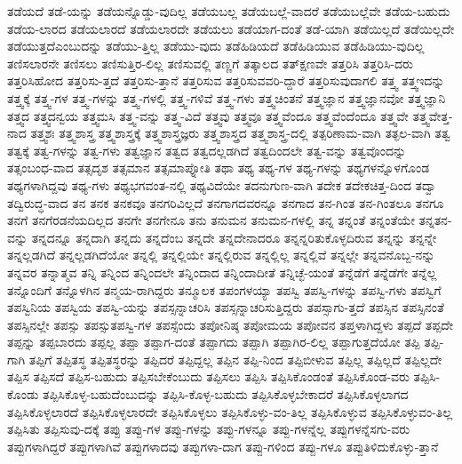 {ತಡೆಯದೆ
ತಡೆ-ಯನ್ನು
ತಡೆಯನ್ನೊಡ್ಡು-ವುದಿಲ್ಲ
ತಡೆಯಬಲ್ಲ
ತಡೆಯಬಲ್ಲೆ-ವಾದರೆ
ತಡೆಯಬಲ್ಲೆವೇ
ತಡೆಯ-ಬಹುದು
ತಡೆಯ-ಲಾರದ
ತಡೆಯಲಾರದೆ
ತಡೆಯಲಾರದೇ
ತಡೆಯಲು
ತಡೆಯಾಗ-ದಂತೆ
ತಡೆ-ಯಾಗಿ
ತಡೆಯಿಲ್ಲದೆ
ತಡೆಯಿಲ್ಲದೇ
ತಡೆಯುತ್ತದೆಎಂಬುದನ್ನು
ತಡೆಯು-ತ್ತಿಲ್ಲ
ತಡೆಯು-ವುದು
ತಡೆಹಿಡಿಯದೆ
ತಡೆಹಿಡಿಯುವ
ತಡೆಹಿಡಿಯು-ವುದಿಲ್ಲ
ತಣಿಸಲಾರನೇ
ತಣಿಸಲು
ತಣಿಸುತ್ತಿರ-ಲಿಲ್ಲ
ತಣಿಸುವಲ್ಲಿ
ತಣ್ಣಗೆ
ತತ್ಕಾಲದ
ತತ್ಕ್ಷಣವೇ
ತತ್ತರಿಸಿ
ತತ್ತರಿಸಿ-ದರು
ತತ್ತರಿಸಿಹೋದ
ತತ್ತರಿಸು-ತ್ತದೆ
ತತ್ತರಿಸು-ತ್ತಾನೆ
ತತ್ತರಿಸುವ
ತತ್ತರಿಸುವವರಿ-ದ್ದಾರೆ
ತತ್ತರಿಸುವುದಾಗಲಿ
ತತ್ತ್ವ
ತತ್ತ್ವಇದನ್ನು
ತತ್ತ್ವಕ್ಕೆ
ತತ್ತ್ವ-ಗಳ
ತತ್ತ್ವ-ಗಳನ್ನು
ತತ್ತ್ವ-ಗಳಲ್ಲಿ
ತತ್ತ್ವ-ಗಳಿವೆ
ತತ್ತ್ವ-ಗಳು
ತತ್ತ್ವಚಿಂತನೆ
ತತ್ತ್ವಜ್ಞಾನ
ತತ್ತ್ವಜ್ಞಾನವೋ
ತತ್ತ್ವಜ್ಞಾನಿ
ತತ್ತ್ವದ
ತತ್ತ್ವದನ್ವಯ
ತತ್ತ್ವಮಸಿ
ತತ್ತ್ವ-ವನ್ನು
ತತ್ತ್ವ-ವಿದೆ
ತತ್ತ್ವವು
ತತ್ತ್ವವೂ
ತತ್ತ್ವವೆಂದೂ
ತತ್ತ್ವವೆಂದೆಂದೂ
ತತ್ತ್ವವೇ
ತತ್ತ್ವವೇತ್ತ-ನಾದ
ತತ್ತ್ವಶಃ
ತತ್ತ್ವಶಾಸ್ತ್ರ
ತತ್ತ್ವಶಾಸ್ತ್ರಕ್ಕೆ
ತತ್ತ್ವಶಾಸ್ತ್ರಜ್ಞರು
ತತ್ತ್ವಶಾಸ್ತ್ರದ
ತತ್ತ್ವಶಾಸ್ತ್ರ-ದಲ್ಲಿ
ತತ್ಪರಿಣಾಮ-ವಾಗಿ
ತತ್ಫಲ-ವಾಗಿ
ತತ್ವ
ತತ್ವಕ್ಕೆ
ತತ್ವ-ಗಳನ್ನು
ತತ್ವ-ಗಳು
ತತ್ವಜ್ಞಾನ
ತತ್ವದ
ತತ್ವದಲ್ಲಡಗಿದೆ
ತತ್ವದಿಂದಲೇ
ತತ್ವ-ವನ್ನು
ತತ್ವವೊಂದನ್ನು
ತತ್ಸಂಬಂಧ-ವಾದ
ತತ್ಸದೃಶ
ತತ್ಸಮಾನ
ತತ್ಸಮಾಪ್ನೋತಿ
ತಥಾ
ತಥ್ಯ
ತಥ್ಯ-ಗಳ
ತಥ್ಯ-ಗಳನ್ನು
ತಥ್ಯಗಳನ್ನೊಳಗೊಂಡ
ತಥ್ಯಗಳಾಗಿದ್ದವು
ತಥ್ಯ-ಗಳು
ತಥ್ಯಭಗವಂತ-ನಲ್ಲಿ
ತಥ್ಯವಿದೆಯೇ
ತದನುಗುಣ-ವಾಗಿ
ತದೇಕ
ತದೇಕಚಿತ್ತ-ದಿಂದ
ತದ್ವಾ
ತದ್ವಿರುದ್ಧ-ವಾದ
ತನ
ತನಕ
ತನಕವೂ
ತನಗರಿವಿಲ್ಲದೆ
ತನಗಾಗದವರನ್ನೂ
ತನಗಾದ
ತನ-ಗಿಂತ
ತನ-ಗಿಂತಲೂ
ತನಗೂ
ತನಗೆ
ತನಗೆರಡನೆಯದಿಲ್ಲದ
ತನಗೇ
ತನಗೇನೂ
ತನು
ತನುಮನ
ತನುಮನ-ಗಳಲ್ಲಿ
ತನ್ನ
ತನ್ನಂತೆ
ತನ್ನಂತೆಯೇ
ತನ್ನತನ-ವನ್ನು
ತನ್ನದನ್ನೂ
ತನ್ನದಾಗಿ
ತನ್ನದು
ತನ್ನದೆಂಬ
ತನ್ನದೇ
ತನ್ನದೇನಾದರೂ
ತನ್ನನ್ನರಿತುಕೊಳ್ಳದಿರುವ
ತನ್ನನ್ನು
ತನ್ನನ್ನೇ
ತನ್ನಲ್ಲಡಗಿದೆ
ತನ್ನಲ್ಲಡಗಿದೆಯೋ
ತನ್ನಲ್ಲಿ
ತನ್ನಲ್ಲಿಯೇ
ತನ್ನಲ್ಲಿರುವ
ತನ್ನಲ್ಲಿಲ್ಲ
ತನ್ನಲ್ಲಿವೆ
ತನ್ನಲ್ಲೇ
ತನ್ನವನೊಬ್ಬ-ನನ್ನು
ತನ್ನವರ
ತನ್ನಾತ್ಮವ
ತನ್ನಿ
ತನ್ನಿಂದ
ತನ್ನಿಂದಲೇ
ತನ್ನಿಂದಾದ
ತನ್ನಿಂದಾದೀತೆ
ತನ್ನಿಚ್ಛೆ-ಯಂತೆ
ತನ್ನೆಡೆಗೆ
ತನ್ನೆಡೆಗೇ
ತನ್ನೆಲ್ಲ
ತನ್ನೊಂದಿಗೆ
ತನ್ನೊಳಗಿನ
ತನ್ಮಯ-ರಾಗಿದ್ದರು
ತನ್ಮೂಲಕ
ತಪಂಗಳಯ್ಯಾ
ತಪಸ್ವಿ
ತಪಸ್ವಿ-ಗಳನ್ನು
ತಪಸ್ವಿ-ಗಳು
ತಪಸ್ವಿಗೆ
ತಪಸ್ವಿನಿಯ
ತಪಸ್ವಿಯ
ತಪಸ್ವಿ-ಯನ್ನು
ತಪಸ್ಸನ್ನಾಚರಿಸಿ
ತಪಸ್ಸನ್ನಾಚರಿಸುತ್ತಿದ್ದರು
ತಪಸ್ಸಾಗು-ತ್ತದೆ
ತಪಸ್ಸಿನ
ತಪಸ್ಸಿನಂತೆ
ತಪಸ್ಸಿನಲ್ಲೇ
ತಪಸ್ಸು
ತಪಸ್ಸುತಪಸ್ವಿ-ಗಳ
ತಪಸ್ಸೆಂದು
ತಪೋನಿಷ್ಠ
ತಪೋಮಯ
ತಪೋವನ
ತಪ್ತಳಾಗಿದ್ದಳು
ತಪ್ಪದೆ
ತಪ್ಪದೇ
ತಪ್ಪನ್ನು
ತಪ್ಪಬಾರದು
ತಪ್ಪಲ್ಲ
ತಪ್ಪಾ
ತಪ್ಪಾಗ-ದಂತೆ
ತಪ್ಪಾಗದು
ತಪ್ಪಾಗಿ
ತಪ್ಪಾಗಿರ-ಲಿಲ್ಲ
ತಪ್ಪಾಗುತ್ತದೆಯೋ
ತಪ್ಪಿ
ತಪ್ಪಿ-ಗಾಗಿ
ತಪ್ಪಿಗೆ
ತಪ್ಪಿತಸ್ಥ
ತಪ್ಪಿತಸ್ಥರನ್ನು
ತಪ್ಪಿದರೆ
ತಪ್ಪಿದ್ದಲ್ಲ
ತಪ್ಪಿನ
ತಪ್ಪಿ-ನಿಂದ
ತಪ್ಪಿಬೀಳುವ
ತಪ್ಪಿಲ್ಲ
ತಪ್ಪಿಲ್ಲದೆ
ತಪ್ಪಿಲ್ಲದೇ
ತಪ್ಪಿಸ
ತಪ್ಪಿಸದೆ
ತಪ್ಪಿಸ-ಬಹುದು
ತಪ್ಪಿಸಬೇಕೆಂಬುದು
ತಪ್ಪಿಸಲು
ತಪ್ಪಿಸಿ
ತಪ್ಪಿಸಿಕೊಂಡಂತೆ
ತಪ್ಪಿಸಿಕೊಂಡ-ವರು
ತಪ್ಪಿಸಿ-ಕೊಂಡು
ತಪ್ಪಿಸಿಕೊಳ್ಳ-ಬಹುದೆಂಬುದನ್ನು
ತಪ್ಪಿಸಿ-ಕೊಳ್ಳ-ಬಹುದು
ತಪ್ಪಿಸಿಕೊಳ್ಳಬೇಕಾದರೆ
ತಪ್ಪಿಸಿಕೊಳ್ಳಲಾಗದ
ತಪ್ಪಿಸಿಕೊಳ್ಳಲಾರದೆ
ತಪ್ಪಿಸಿಕೊಳ್ಳಲಾರದೇ
ತಪ್ಪಿಸಿಕೊಳ್ಳಲು
ತಪ್ಪಿಸಿಕೊಳ್ಳು-ವಂ-ತಿಲ್ಲ
ತಪ್ಪಿಸಿಕೊಳ್ಳುವ
ತಪ್ಪಿಸಿಕೊಳ್ಳುವಂ-ತಿಲ್ಲ
ತಪ್ಪಿಸಿತು
ತಪ್ಪಿಸುವು-ದಕ್ಕೆ
ತಪ್ಪು
ತಪ್ಪು-ಗಳ
ತಪ್ಪು-ಗಳನ್ನು
ತಪ್ಪು-ಗಳನ್ನೂ
ತಪ್ಪು-ಗಳನ್ನೆಲ್ಲ
ತಪ್ಪುಗಳನ್ನೆಸಗು-ವರು
ತಪ್ಪುಗಳಾಗಿದ್ದರೆ
ತಪ್ಪುಗಳಾಗಿವೆ
ತಪ್ಪುಗಳಾದವು
ತಪ್ಪುಗಳಾ-ದಾಗ
ತಪ್ಪು-ಗಳಿಂದ
ತಪ್ಪು-ಗಳೂ
ತಪ್ಪುತಿಳಿದುಕೊಳ್ಳು-ತ್ತಾನೆ
}
